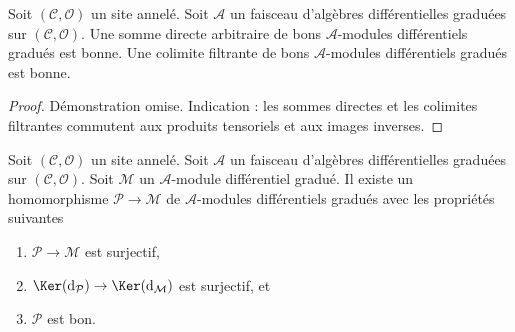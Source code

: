 \begin{lemma}
\label{lemma-good-direct-sum}
Soit $(\mathcal{C}, \mathcal{O})$ un site annelé.
Soit $\mathcal{A}$ un faisceau d'algèbres différentielles graduées sur $(\mathcal{C}, \mathcal{O})$.
Une somme directe arbitraire de bons $\mathcal{A}$-modules différentiels gradués est bonne.
Une colimite filtrante de bons $\mathcal{A}$-modules différentiels gradués est bonne.
\end{lemma}

\begin{proof}
Démonstration omise.
Indication : les sommes directes et les colimites filtrantes commutent aux produits tensoriels et aux images inverses.
\end{proof}

\begin{lemma}
\label{lemma-good-quotient}
Soit $(\mathcal{C}, \mathcal{O})$ un site annelé.
Soit $\mathcal{A}$ un faisceau d'algèbres différentielles graduées sur $(\mathcal{C}, \mathcal{O})$.
Soit $\mathcal{M}$ un $\mathcal{A}$-module différentiel gradué.
Il existe un homomorphisme $\mathcal{P} \to \mathcal{M}$ de $\mathcal{A}$-modules différentiels gradués avec les propriétés suivantes
\begin{enumerate}
\item $\mathcal{P} \to \mathcal{M}$ est surjectif,
\item $\Ker(\text{d}_\mathcal{P}) \to \Ker(\text{d}_\mathcal{M})$ est surjectif, et
\item $\mathcal{P}$ est bon.
\end{enumerate}
\end{lemma}

